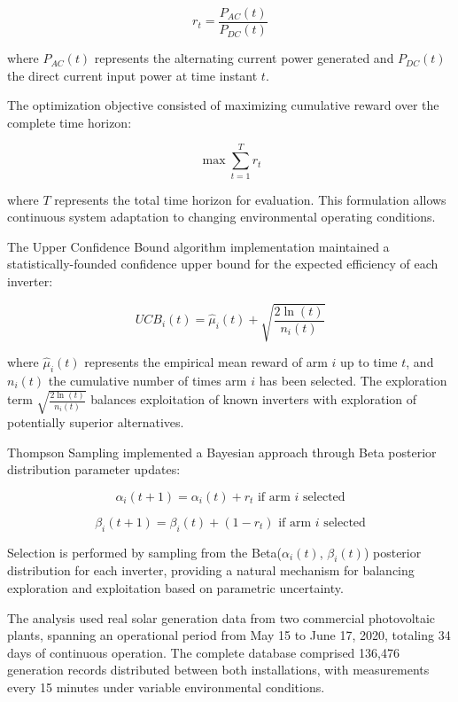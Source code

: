 \documentclass[conference]{IEEEtran}
\begin{document}
\begin{equation}
r_t = \frac{P_{AC}(t)}{P_{DC}(t)}
\end{equation}

where $P_{AC}(t)$ represents the alternating current power generated and $P_{DC}(t)$ the direct current input power at time instant $t$.

The optimization objective consisted of maximizing cumulative reward over the complete time horizon:

\begin{equation}
\max \sum_{t=1}^{T} r_t
\end{equation}

where $T$ represents the total time horizon for evaluation. This formulation allows continuous system adaptation to changing environmental operating conditions.

The Upper Confidence Bound algorithm implementation maintained a statistically-founded confidence upper bound for the expected efficiency of each inverter:

\begin{equation}
UCB_i(t) = \hat{\mu}_i(t) + \sqrt{\frac{2 \ln(t)}{n_i(t)}}
\end{equation}

where $\hat{\mu}_i(t)$ represents the empirical mean reward of arm $i$ up to time $t$, and $n_i(t)$ the cumulative number of times arm $i$ has been selected. The exploration term $\sqrt{\frac{2 \ln(t)}{n_i(t)}}$ balances exploitation of known inverters with exploration of potentially superior alternatives.

Thompson Sampling implemented a Bayesian approach through Beta posterior distribution parameter updates:

\begin{equation}
\alpha_i(t + 1) = \alpha_i(t) + r_t \text{ if arm } i \text{ selected}
\end{equation}

\begin{equation}
\beta_i(t + 1) = \beta_i(t) + (1-r_t) \text{ if arm } i \text{ selected}
\end{equation}

Selection is performed by sampling from the Beta($\alpha_i(t)$, $\beta_i(t)$) posterior distribution for each inverter, providing a natural mechanism for balancing exploration and exploitation based on parametric uncertainty.

The analysis used real solar generation data from two commercial photovoltaic plants, spanning an operational period from May 15 to June 17, 2020, totaling 34 days of continuous operation. The complete database comprised 136,476 generation records distributed between both installations, with measurements every 15 minutes under variable environmental conditions.
\end{document}

